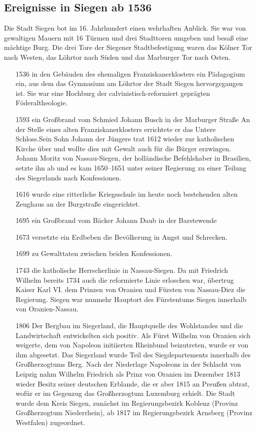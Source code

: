 \documentclass[paper=a4, fontsize=11pt]{scrartcl} %
\numberwithin{equation}{section}		%
\numberwithin{figure}{section}			%
\numberwithin{table}{section}			%
\begin{document}
 \subsection{Ereignisse in Siegen ab 1536}
 Die Stadt Siegen bot im 16. Jahrhundert einen wehrhaften Anblick. Sie war von gewaltigen Mauern mit 16 Türmen und drei Stadttoren umgeben und besaß eine mächtige Burg. Die drei Tore der Siegener Stadtbefestigung waren das Kölner Tor nach Westen, das Löhrtor nach Süden und das Marburger Tor nach Osten. 
 \begin{itemize}\setlength\itemsep{0pt}
 	\item [1536] in den Gebäuden des ehemaligen Franziskanerklosters ein Pädagogium ein, aus dem das Gymnasium am Löhrtor der Stadt Siegen hervorgegangen ist. Sie war eine Hochburg der calvinistisch-reformiert geprägten Föderaltheologie.  
 	\item [1593] ein Großbrand vom Schmied Johann Busch in der Marburger Straße An der Stelle eines alten Franziskanerklosters errichtete er das Untere Schloss.Sein Sohn Johann der Jüngere trat 1612 wieder zur katholischen Kirche über und wollte dies mit Gewalt auch für die Bürger erzwingen. Johann Moritz von Nassau-Siegen, der holländische Befehlshaber in Brasilien, setzte ihn ab und es kam 1650–1651 unter seiner Regierung zu einer Teilung des Siegerlands nach Konfessionen. 
 	\item [1616] wurde eine ritterliche Kriegsschule im heute noch bestehenden alten Zeughaus an der Burgstraße eingerichtet.
 	\item [1695] ein Großbrand vom Bäcker Johann Daub in der Barstewende
 	\item [1673] versetzte ein Erdbeben die Bevölkerung in Angst und Schrecken.
 	\item [1699] zu Gewalttaten zwischen beiden Konfessionen. 
 	\item [1743] die katholische Herrscherlinie in Nassau-Siegen. Da mit Friedrich Wilhelm bereits 1734 auch die reformierte Linie erloschen war, übertrug Kaiser Karl VI. dem Prinzen von Oranien und Fürsten von Nassau-Diez die Regierung. Siegen war nunmehr Hauptort des Fürstentums Siegen innerhalb von Oranien-Nassau.
  	\item [1806] Der Bergbau im Siegerland, die Hauptquelle des Wohlstandes und die Landwirtschaft entwickelten sich positiv. Als Fürst Wilhelm von Oranien sich weigerte, dem von Napoleon initiierten Rheinbund beizutreten, wurde er von ihm abgesetzt. Das Siegerland wurde Teil des Siegdepartements innerhalb des Großherzogtums Berg. Nach der Niederlage Napoleons in der Schlacht von Leipzig nahm Wilhelm Friedrich als Prinz von Oranien im Dezember 1813 wieder Besitz seiner deutschen Erblande, die er aber 1815 an Preußen abtrat, wofür er im Gegenzug das Großherzogtum Luxemburg erhielt. Die Stadt wurde dem Kreis Siegen, zunächst im Regierungsbezirk Koblenz (Provinz Großherzogtum Niederrhein), ab 1817 im Regierungsbezirk Arnsberg (Provinz Westfalen) zugeordnet.

\end{itemize}
\end{document}
